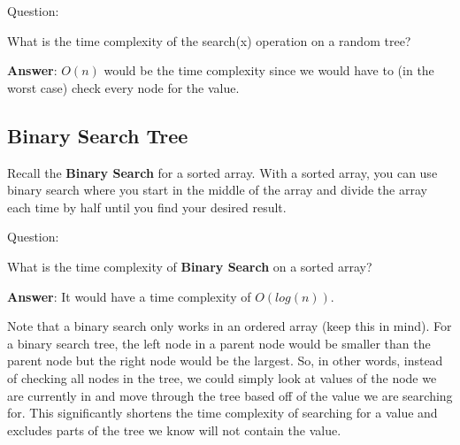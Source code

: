 \documentclass[11pt,a4paper,english]{paper}
\begin{document}
\bigskip

\begin{gbox}{Question:} {

  What is the time complexity of the search(x) operation on a random tree?

  \bigskip\textbf{Answer}: $O(n)$ would be the time complexity since we would have to (in the worst case) check every node for the value.


}\end{gbox}

\subsection{Binary Search Tree}

Recall the \textbf{Binary Search} for a sorted array. With a sorted array, you can use binary search where you start in the middle of the array and divide the array each time by half until you find your desired result.

\bigskip
\begin{gbox}{Question:} {

    What is the time complexity of \textbf{Binary Search} on a sorted array?

    \bigskip
    \textbf{Answer}: It would have a time complexity of $O(log(n))$.

}\end{gbox}

\bigskip

Note that a binary search only works in an ordered array (keep this in mind). For a binary search tree, the left node in a parent node would be smaller than the parent node but the right node would be the largest. So, in other words, instead of checking all nodes in the tree, we could simply look at values of the node we are currently in and move through the tree based off of the value we are searching for. This significantly shortens the time complexity of searching for a value and excludes parts of the tree we know will not contain the value.
\end{document}
